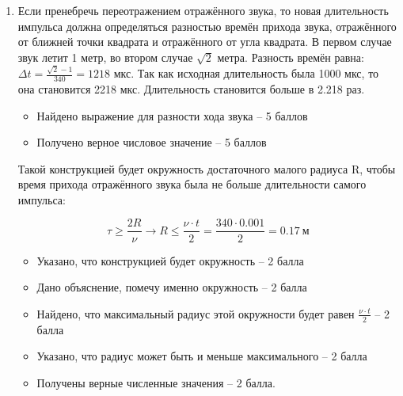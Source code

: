 \solutionSection

\begin{enumerate}
    \item Если пренебречь переотражением отражённого звука, то новая длительность импульса должна определяться разностью времён прихода звука, отражённого от ближней точки квадрата и отражённого от угла квадрата. В первом случае звук летит 1 метр, во втором случае $\sqrt{2}$ метра. Разность времён равна: $\Delta t = \frac{\sqrt{2}-1}{340}=1218$ мкс. Так как исходная длительность была 1000 мкс, то она становится 2218 мкс. Длительность становится больше в 2.218 раз.
    

    \markSection

    \begin{itemize}
	    \item Найдено выражение для разности хода звука – 5 баллов
	    \item Получено верное числовое значение – 5 баллов
    \end{itemize}

    Такой конструкцией будет окружность достаточного малого радиуса R, чтобы время прихода отражённого звука была не больше длительности самого импульса:
    
    $$\tau \geq \frac{2 R}{\nu } \rightarrow R \leq \frac{\nu  \cdot t}{2}= \frac{340\cdot 0.001}{2}=0.17\: \text{м}$$  


    \markSection
    
    \begin{itemize}
        \item Указано, что конструкцией будет окружность – 2 балла
	    \item Дано объяснение, помечу именно окружность – 2 балла
	    \item Найдено, что максимальный радиус этой окружности будет равен $\frac{\nu \cdot t}{2}$ – 2 балла
	    \item Указано, что радиус может быть и меньше максимального – 2 балла
	    \item Получены верные численные значения – 2 балла.
    \end{itemize}


\end{enumerate}
